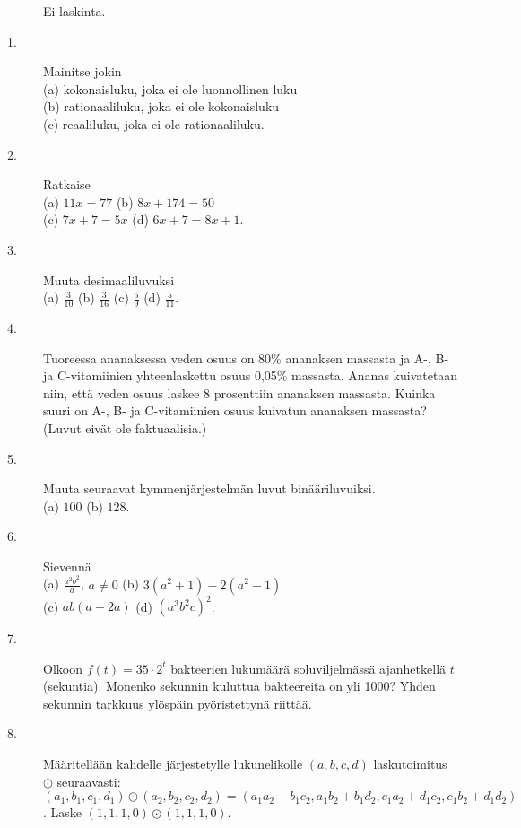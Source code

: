 \begin{description}
	\item[] Ei laskinta.
	\item[1.] Mainitse jokin \\
	(a) kokonaisluku, joka ei ole luonnollinen luku \\
	(b) rationaaliluku, joka ei ole kokonaisluku \\
	(c) reaaliluku, joka ei ole rationaaliluku.
	\item[2.] Ratkaise \\
	(a) $11x=77$ \qquad
	(b) $8x+174=50$ \\
	(c) $7x+7=5x$ \qquad
	(d) $6x+7=8x+1$.
	\item[3.] Muuta desimaaliluvuksi \\
	(a) $\frac{3}{10}$ \qquad
	(b) $\frac{3}{16}$ \qquad
	(c) $\frac{5}{9}$ \qquad
	(d) $\frac{5}{11}$.
	\item[4.] Tuoreessa ananaksessa veden osuus on 80\% ananaksen massasta ja A-, B- ja C-vitamiinien yhteenlaskettu osuus 0,05\% massasta. Ananas kuivatetaan niin, että veden osuus laskee 8 prosenttiin ananaksen massasta. Kuinka suuri on A-, B- ja C-vitamiinien osuus kuivatun ananaksen massasta? (Luvut eivät ole faktuaalisia.)
	\item[5.] Muuta seuraavat kymmenjärjestelmän luvut binääriluvuiksi. \\
	(a) $100$ \qquad
	(b) $128$.
	\item[6.] Sievennä \\
	(a) $\frac{a^2 b^2}{a}$, $a \neq 0$ \qquad
	(b) $3(a^2+1)-2(a^2-1)$ \\
	(c) $ab(a+2a)$ \qquad
	(d) $(a^3 b^2 c)^2$.
	\item[7.] Olkoon $f(t) = 35 \cdot 2^t$ bakteerien lukumäärä soluviljelmässä ajanhetkellä $t$ (sekuntia). Monenko sekunnin kuluttua bakteereita on yli 1000? Yhden sekunnin tarkkuus ylöspäin pyöristettynä riittää.
	\item[8.] Määritellään kahdelle järjestetylle lukunelikolle $(a, b, c, d)$ laskutoimitus $\odot$ seuraavasti: $(a_1, b_1, c_1, d_1) \odot (a_2, b_2, c_2, d_2) = (a_1 a_2 + b_1 c_2, a_1 b_2 + b_1 d_2, c_1 a_2 + d_1 c_2, c_1 b_2 + d_1 d_2)$. Laske $(1, 1, 1, 0) \odot (1, 1, 1, 0)$.

\end{description}
